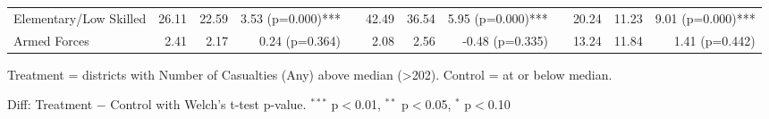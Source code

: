 \begin{table}[htbp]
\begin{tabular}{l rrr c rrr c rrr}
\quad Elementary/Low Skilled & 26.11 & 22.59 & 3.53 (p=0.000)*** &  & 42.49 & 36.54 & 5.95 (p=0.000)*** &  & 20.24 & 11.23 & 9.01 (p=0.000)*** \\
\quad Armed Forces & 2.41 & 2.17 & 0.24 (p=0.364) &  & 2.08 & 2.56 & -0.48 (p=0.335) &  & 13.24 & 11.84 & 1.41 (p=0.442) \\
\bottomrule
\end{tabular}
\begin{tablenotes}
\small
\item Treatment = districts with Number of Casualties (Any) above median (>202). Control = at or below median.
\item Diff: Treatment $-$ Control with Welch's t-test p-value. $^{{***}}$ p$<$0.01, $^{{**}}$ p$<$0.05, $^{{*}}$ p$<$0.10
\end{tablenotes}
\end{table}

\clearpage

